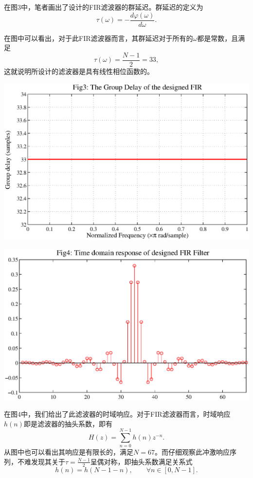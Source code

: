 \documentclass[a4paper,11pt,onecolumn,twoside]{article}
\begin{document}
在图3中，笔者画出了设计的FIR滤波器的群延迟。群延迟的定义为
\begin{equation}
\tau (\omega) = - \frac{d \varphi (\omega)}{d \omega}.
\end{equation}

在图中可以看出，对于此FIR滤波器而言，其群延迟对于所有的$\omega$都是常数，且满足
\begin{equation}
\tau (\omega) = \frac{N-1}{2} = 33,
\end{equation}
这就说明所设计的滤波器是具有线性相位函数的。
\begin{center}
    \includegraphics[width=1\textwidth]{fig3.eps}
\end{center}

\begin{center}
    \includegraphics[width=1\textwidth]{fig4.eps}
\end{center}

在图4中，我们给出了此滤波器的时域响应。对于FIR滤波器而言，时域响应$h(n)$即是滤波器的抽头系数，即有
\begin{equation}
H(z) = \sum_{n=0}^{N-1} h(n) z^{-n}.
\end{equation}
从图中也可以看出其响应是有限长的，满足$N=67$。而仔细观察此冲激响应序列，不难发现其关于$\tau = \frac{N-1}{2}$呈偶对称，即抽头系数满足关系式
\begin{equation}
h(n) = h(N-1-n), \qquad \forall n \in [0, N-1].
\end{equation}
\end{document}
